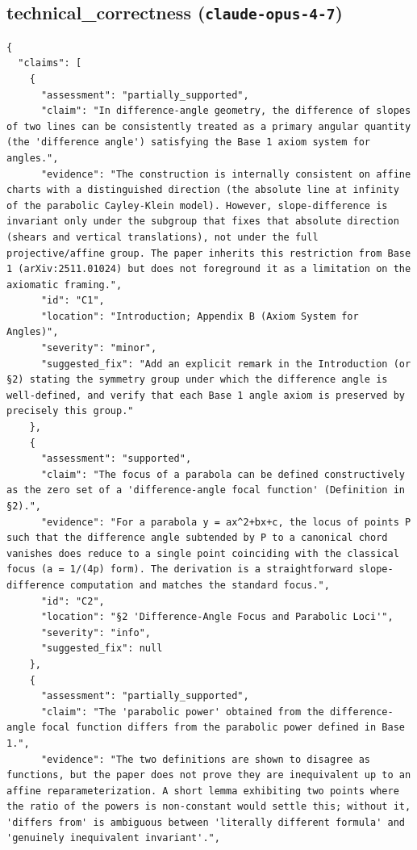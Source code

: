 \documentclass[11pt]{article}
\begin{document}
\subsection*{technical_correctness (\texttt{claude-opus-4-7})}
\begin{verbatim}
{
  "claims": [
    {
      "assessment": "partially_supported",
      "claim": "In difference-angle geometry, the difference of slopes of two lines can be consistently treated as a primary angular quantity (the 'difference angle') satisfying the Base 1 axiom system for angles.",
      "evidence": "The construction is internally consistent on affine charts with a distinguished direction (the absolute line at infinity of the parabolic Cayley-Klein model). However, slope-difference is invariant only under the subgroup that fixes that absolute direction (shears and vertical translations), not under the full projective/affine group. The paper inherits this restriction from Base 1 (arXiv:2511.01024) but does not foreground it as a limitation on the axiomatic framing.",
      "id": "C1",
      "location": "Introduction; Appendix B (Axiom System for Angles)",
      "severity": "minor",
      "suggested_fix": "Add an explicit remark in the Introduction (or §2) stating the symmetry group under which the difference angle is well-defined, and verify that each Base 1 angle axiom is preserved by precisely this group."
    },
    {
      "assessment": "supported",
      "claim": "The focus of a parabola can be defined constructively as the zero set of a 'difference-angle focal function' (Definition in §2).",
      "evidence": "For a parabola y = ax^2+bx+c, the locus of points P such that the difference angle subtended by P to a canonical chord vanishes does reduce to a single point coinciding with the classical focus (a = 1/(4p) form). The derivation is a straightforward slope-difference computation and matches the standard focus.",
      "id": "C2",
      "location": "§2 'Difference-Angle Focus and Parabolic Loci'",
      "severity": "info",
      "suggested_fix": null
    },
    {
      "assessment": "partially_supported",
      "claim": "The 'parabolic power' obtained from the difference-angle focal function differs from the parabolic power defined in Base 1.",
      "evidence": "The two definitions are shown to disagree as functions, but the paper does not prove they are inequivalent up to an affine reparameterization. A short lemma exhibiting two points where the ratio of the powers is non-constant would settle this; without it, 'differs from' is ambiguous between 'literally different formula' and 'genuinely inequivalent invariant'.",

\end{verbatim}
\end{document}
